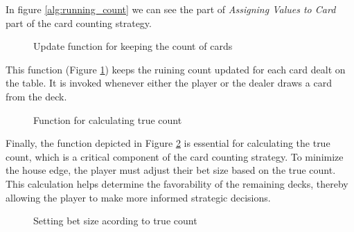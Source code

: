 \documentclass[a4paper,12pt]{report}
\begin{document}
In figure \ref{alg:running_count} we can see the part of \textit{Assigning Values to Card} part of the card counting strategy.

\begin{figure}[H]
\caption{Update function for keeping the count of cards}
\label{alg:update_running_count}
\end{figure}

This function (Figure \ref{alg:update_running_count}) keeps the ruining count updated for each card dealt on the table. It is invoked whenever either the player or the dealer draws a card from the deck.

\begin{figure}[H]
\caption{Function for calculating true count}
\label{alg:calcualte_true_count1}
\end{figure}

Finally, the function depicted in Figure \ref{alg:calcualte_true_count1} is essential for calculating the true count, which is a critical component of the card counting strategy. To minimize the house edge, the player must adjust their bet size based on the true count. This calculation helps determine the favorability of the remaining decks, thereby allowing the player to make more informed strategic decisions.

\begin{figure}[H]
\caption{Setting bet size acording to true count}
\label{alg:calculate_betsize}
\end{figure}
\end{document}
